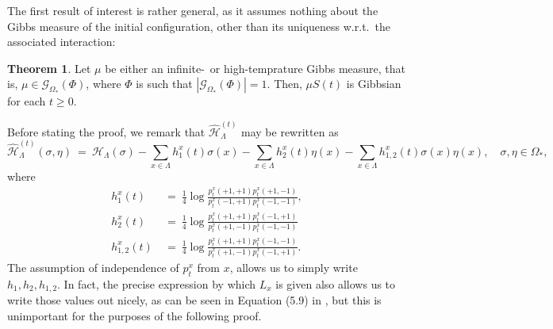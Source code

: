 \documentclass[12pt]{article}
\newcommand{\G}{\mathcal{G}}
\renewcommand{\H}{\mathcal{H}}
\newcommand{\1}{\mathbbm{1}}
\newcommand{\5}{\vspace{0.5cm}}
\renewcommand{\hat}{\widehat}
\theoremstyle{definition}
\newtheorem{thm}{Theorem}[section]
\begin{document}
The first result of interest is rather general, as it assumes nothing about the Gibbs measure of the initial configuration, other than its uniqueness w.r.t.~the associated interaction:

\begin{thm}\label{HighTempTHM}
Let $\mu$ be either an infinite-~or high-temprature Gibbs measure, that is, $\mu\in\G_{\Omega_*}(\Phi)$, where $\Phi$ is such that $|\G_{\Omega_*}(\Phi)|=1$. Then, $\mu S(t)$ is Gibbsian for each $t\geq 0$.
\end{thm}

Before stating the proof, we remark that $\hat{\H}_\Lambda^{(t)}$ may be rewritten as
$$\hat{\H}_\Lambda^{(t)}(\sigma,\eta) ~=~ \H_\Lambda(\sigma) - \sum_{x\in\Lambda}h_1^x(t)\sigma(x) - \sum_{x\in\Lambda}h_2^x(t)\eta(x) - \sum_{x\in\Lambda}h_{1,2}^x(t)\sigma(x)\eta(x), \quad \sigma,\eta\in\Omega_*,$$
where 
\begin{align*}
h_1^x(t) ~&=~ \frac{1}{4}\log\frac{p_t^x(+1,+1)p_t^x(+1,-1)}{p_t^x(-1,+1)p_t^x(-1,-1)}, \\
h_2^x(t) ~&=~ \frac{1}{4}\log\frac{p_t^x(+1,+1)p_t^x(-1,+1)}{p_t^x(+1,-1)p_t^x(-1,-1)} \\
h_{1,2}^x(t) ~&=~ \frac{1}{4}\log\frac{p_t^{x}(+1,+1)p_t^x(-1,-1)}{p_t^x{(+1,-1)}p_t^{x}(-1,+1)}.
\end{align*}
The assumption of independence of $p_t^x$ from $x$, allows us to simply write $h_1,h_2,h_{1,2}$. In fact, the precise expression by which $L_x$ is given also allows us to write those values out nicely, as can be seen in Equation (5.9) in \cite{EFHR}, but this is unimportant for the purposes of the following proof.
\end{document}
